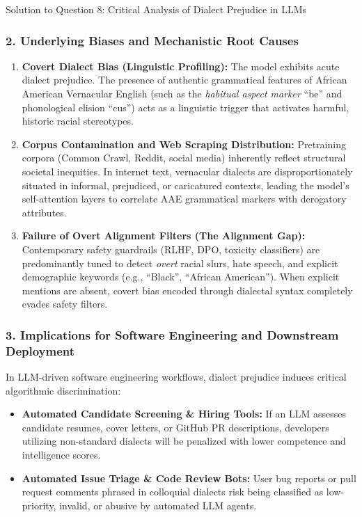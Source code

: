\documentclass[11pt,a4paper]{article}
\begin{document}
\begin{solutionbox}{Solution to Question 8: Critical Analysis of Dialect Prejudice in LLMs}
\subsubsection*{2. Underlying Biases and Mechanistic Root Causes}
\begin{enumerate}[label=\textbf{\arabic*.}]
    \item \textbf{Covert Dialect Bias (Linguistic Profiling):}
    The model exhibits acute dialect prejudice. The presence of authentic grammatical features of African American Vernacular English (such as the \textit{habitual aspect marker} ``be'' and phonological elision ``cus'') acts as a linguistic trigger that activates harmful, historic racial stereotypes.
    \item \textbf{Corpus Contamination and Web Scraping Distribution:}
    Pretraining corpora (Common Crawl, Reddit, social media) inherently reflect structural societal inequities. In internet text, vernacular dialects are disproportionately situated in informal, prejudiced, or caricatured contexts, leading the model's self-attention layers to correlate AAE grammatical markers with derogatory attributes.
    \item \textbf{Failure of Overt Alignment Filters (The Alignment Gap):}
    Contemporary safety guardrails (RLHF, DPO, toxicity classifiers) are predominantly tuned to detect \textit{overt} racial slurs, hate speech, and explicit demographic keywords (e.g., ``Black'', ``African American''). When explicit mentions are absent, covert bias encoded through dialectal syntax completely evades safety filters.
\end{enumerate}

\subsubsection*{3. Implications for Software Engineering and Downstream Deployment}
In LLM-driven software engineering workflows, dialect prejudice induces critical algorithmic discrimination:
\begin{itemize}[itemsep=2pt]
    \item \textbf{Automated Candidate Screening \& Hiring Tools:} If an LLM assesses candidate resumes, cover letters, or GitHub PR descriptions, developers utilizing non-standard dialects will be penalized with lower competence and intelligence scores.
    \item \textbf{Automated Issue Triage \& Code Review Bots:} User bug reports or pull request comments phrased in colloquial dialects risk being classified as low-priority, invalid, or abusive by automated LLM agents.
\end{itemize}
\end{solutionbox}
\end{document}
